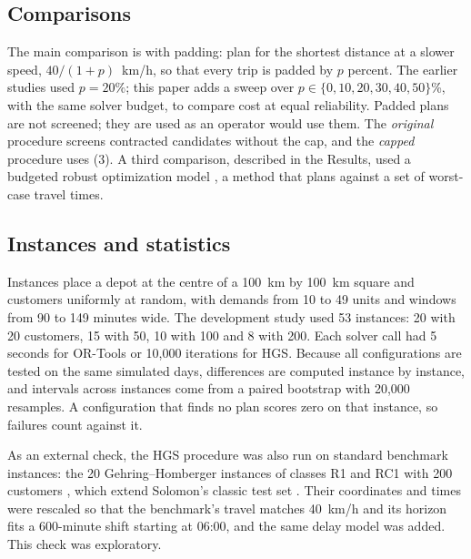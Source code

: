 \documentclass[12pt,letterpaper]{article}
\begin{document}
\subsection{Comparisons}

The main comparison is with padding: plan for the shortest distance at a slower
speed, $40/(1+p)$~km/h, so that every trip is padded by $p$ percent. The earlier
studies used $p=20\%$; this paper adds a sweep over $p\in\{0,10,20,30,40,50\}$\%,
with the same solver budget, to compare cost at equal reliability. Padded plans are
not screened; they are used as an operator would use them. The \emph{original}
procedure screens contracted candidates without the cap, and the \emph{capped}
procedure uses (3). A third comparison, described in the
Results, used a budgeted robust optimization model \cite{bertsimas2004,agra2013}, a
method that plans against a set of worst-case travel times.

\subsection{Instances and statistics}

Instances place a depot at the centre of a 100~km by 100~km square and customers
uniformly at random, with demands from 10 to 49 units and windows from 90 to 149
minutes wide. The development study used 53 instances: 20 with 20 customers, 15
with 50, 10 with 100 and 8 with 200. Each solver call had 5 seconds for OR-Tools or
10,000 iterations for HGS. Because all configurations are tested on the same
simulated days, differences are computed instance by instance, and intervals across
instances come from a paired bootstrap with 20,000 resamples. A configuration that
finds no plan scores zero on that instance, so failures count against it.

As an external check, the HGS procedure was also run on standard benchmark
instances: the 20 Gehring--Homberger instances of classes R1 and RC1 with 200
customers \cite{gehring1999}, which extend Solomon's classic test
set \cite{solomon1987}. Their coordinates and times were rescaled so that the
benchmark's travel matches 40~km/h and its horizon fits a 600-minute shift
starting at 06:00, and the same delay model was added. This check was exploratory.
\end{document}
